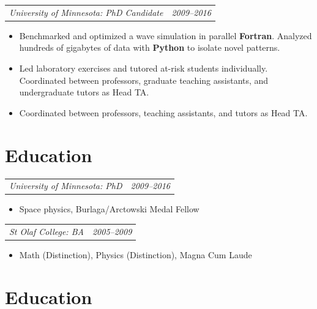 \documentclass[12pt,letterpaper]{article}
\makeatletter
\newcommand{\fancy}[1]{{\ocrfamily #1}}
\newcommand{\ResumeSection}[1]{\section*{{\color{MidnightBlue}\sout{\hfill}\fancy{#1}\sout{\hfill}}}}
\newcommand{\headerpair}[2]{
    \begin{tabular*}{\linewidth}{l@{ \extracolsep{\fill} }r} {\large\emph{#1}} & {\large\emph{#2}}
    \end{tabular*}
}
\newcommand{\headerrow}[3]{\headerpair{#2: #1}{#3}}
\makeatother
\begin{document}
\headerrow
    {PhD Candidate}
    {University of Minnesota}
    {2009--2016}
\begin{itemize}
    \item Benchmarked and optimized a wave simulation in parallel \textbf{Fortran}. Analyzed hundreds of gigabytes of data with \textbf{Python} to isolate novel patterns.


    \item Led laboratory exercises and tutored at-risk students individually. Coordinated between professors, graduate teaching assistants, and undergraduate tutors as Head TA.
    \item Coordinated between professors, teaching assistants, and tutors as Head TA.

\end{itemize}


\ResumeSection{Education}

\headerrow
    {PhD}
    {University of Minnesota}
    {2009--2016}
\begin{itemize}
    \item Space physics, Burlaga/Arctowski Medal Fellow
\end{itemize}

\headerrow
    {BA}
    {St Olaf College}
    {2005--2009}
\begin{itemize}
    \item Math (Distinction), Physics (Distinction), Magna Cum Laude
\end{itemize}

\ResumeSection{Education}
\end{document}
